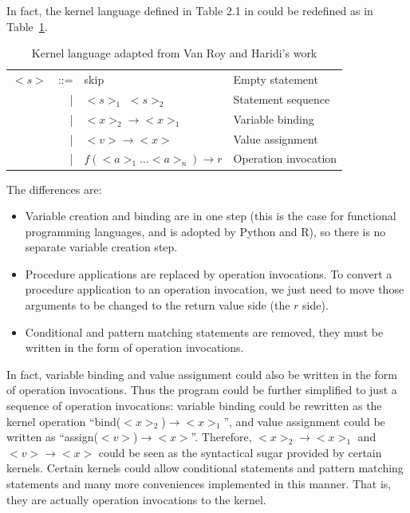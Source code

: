 In fact, the kernel language defined in Table 2.1 in \cite{van2004concepts} could be redefined as in Table~\ref{tab:kernel}. 
\begin{table}
	\centering
	\begin{tabular}{|rrll|}
		\hline $<s>$ & ::= & skip & Empty statement \\ 
		  & | & $<s>_1$ $<s>_2$ & Statement sequence \\ 
		  & | & $<x>_2\rightarrow <x>_1$ & Variable binding \\ 
		  & | & $<v>\rightarrow<x>$ & Value assignment \\ 
		  & | & $f(<a>_1\dots<a>_n)\rightarrow r$ & Operation invocation \\ 
		\hline 
	\end{tabular} 
	\caption{Kernel language adapted from Van Roy and Haridi's work}
	\label{tab:kernel}
\end{table}
The differences are:
\begin{itemize}
	\item Variable creation and binding are in one step (this is the case for functional programming languages, and is adopted by Python and R), so there is no separate variable creation step.
	\item Procedure applications are replaced by operation invocations. To convert a procedure application to an operation invocation, we just need to move those arguments to be changed to the return value side (the $r$ side).
	\item Conditional and pattern matching statements are removed, they must be written in the form of operation invocations.
\end{itemize}
In fact, variable binding and value assignment could also be written in the form of operation invocations. Thus the program could be further simplified to just a sequence of operation invocations: variable binding could be rewritten as the kernel operation ``bind($<x>_2$)$\rightarrow <x>_1$'', and value assignment could be written as ``assign($<v>$)$\rightarrow <x>$''. Therefore, $<x>_2\rightarrow <x>_1$ and $<v>\rightarrow<x>$ could be seen as the syntactical sugar provided by certain kernels. Certain kernels could allow conditional statements and pattern matching statements and many more conveniences implemented in this manner. That is, they are actually operation invocations to the kernel.

